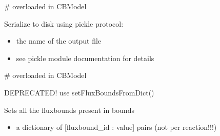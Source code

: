 \documentclass[letterpaper,10pt,english]{sphinxmanual}
\begin{document}
\begin{fulllineitems}
\begin{fulllineitems}
\begin{itemize}
\begin{description}
\end{description}

\end{itemize}

\sphinxAtStartPar
\# overloaded in CBModel

\end{fulllineitems}


\begin{fulllineitems}
\label{\detokenize{modules_doc:cbmpy.CBModel.Model.serializeToDisk}}
\pysigstartsignatures
{}
\pysigstopsignatures
\sphinxAtStartPar
Serialize to disk using pickle protocol:
\begin{itemize}
\item {} 
\sphinxAtStartPar
{} the name of the output file

\item {} \begin{description}
\sphinxAtStartPar
see pickle module documentation for details

\end{description}

\end{itemize}

\sphinxAtStartPar
\# overloaded in CBModel

\end{fulllineitems}


\begin{fulllineitems}
\label{\detokenize{modules_doc:cbmpy.CBModel.Model.setAllFluxBounds}}
\pysigstartsignatures
{}
\pysigstopsignatures
\sphinxAtStartPar
DEPRECATED! use setFluxBoundsFromDict()

\sphinxAtStartPar
Sets all the fluxbounds present in bounds
\begin{itemize}
\item {} 
\sphinxAtStartPar
{} a dictionary of {[}fluxbound\_id : value{]} pairs (not per reaction!!!)


\end{itemize}
\end{fulllineitems}
\end{fulllineitems}
\end{document}
